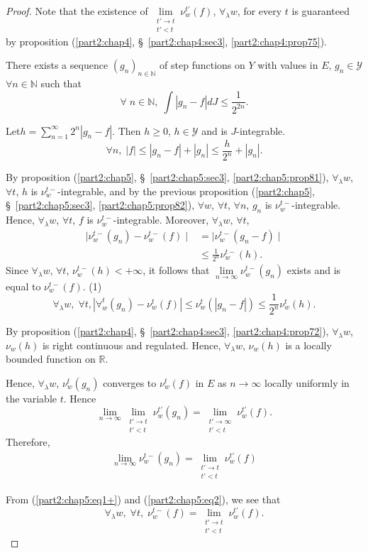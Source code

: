 \begin{proof}
Note that the existence of $\lim\limits_{\substack{t' \to t\\t' <t}}
\nu^{t'}_w(f)$, $\forall_\lambda w$, for every $t$ is guaranteed by
proposition (\ref{part2:chap4}, \S\ \ref{part2:chap4:sec3},
\ref{part2:chap4:prop75}).  

There exists a sequence $(g_n)_{n \in\mathbb{N}}$ of step functions on
$Y$ with values in $E$, $g_n \in \mathscr{Y}$ $\forall n \in
\mathbb{N}$ such that 
$$
\forall \; n \in \mathbb{N}, \; \int |g_n -f| d J \leq
\frac{1}{2^{2n}}. 
$$

Let\pageoriginale $h = \sum\limits^\infty_{n=1} 2^n |g_n -f|$. Then $h
\geq 0$, $h \in \mathscr{Y}$ and is $J$-integrable.
$$
\forall n, \; |f| \leq |g_n -f| + |g_n| \leq \frac{h}{2^n} + |g_n|. 
$$

By proposition (\ref{part2:chap5}, \S\ \ref{part2:chap5:sec3},
\ref{part2:chap5:prop81}), $\forall_\lambda w$, $\forall t$, $h$ 
is $\nu^{t-}_w$-integrable, and by the previous proposition
(\ref{part2:chap5}, \S\ \ref{part2:chap5:sec3},
\ref{part2:chap5:prop82}), $\forall w$, $\forall t$, $\forall n$,
$g_n$ is 
$\nu^{t-}_w$-integrable. Hence, $\forall_\lambda w$, $\forall t$, $f$
is $\nu^{t-}_w$-integrable. Moreover, $\forall_\lambda w$, $\forall
t$, 
\begin{align*}
\mid \nu^{t-}_w(g_n) - \nu^{t-}_w (f)\mid & = \mid \nu^{t-}_w(g_n
-f)\mid\\
& \leq \frac{1}{2^n} \nu^{t-}_w(h).
\end{align*}
Since $\forall_\lambda w$, $\forall t$, $\nu^{t-}_w(h) < + \infty$, it
follows that $\lim\limits_{n \to \infty} \nu^{t-}_w(g_n)$ exists and
is equal to $\nu^{t-}_w(f)$. \hfill{(1)}
$$
\forall_\lambda w, \;\forall t, |\forall^t_w(g_n) - \nu^t_w(f)| \leq
\nu^t_w(|g_n-f|)\leq \frac{1}{2^n}  \nu^t_w(h). 
$$

By proposition (\ref{part2:chap4}, \S\ \ref{part2:chap4:sec3},
\ref{part2:chap4:prop72}), $\forall_\lambda w$, $\nu_w(h)$ is 
right continuous and regulated. Hence, $\forall_\lambda w$, $\nu_w(h)$
is a locally bounded function on $\mathbb{R}$.

Hence, $\forall_\lambda w$, $\nu^t_w(g_n)$ converges to $\nu^t_w(f)$
in $E$ as $n \to \infty$ locally uniformly in the variable $t$. Hence
$$
\lim\limits_{n \to \infty} \lim\limits_{\substack{t'\to t\\t'<t}}
\nu^{t'}_w(g_n) = \lim\limits_{\substack{t'\to \infty\\t'<t}}
\nu^{t'}_w(f). 
$$
Therefore, 
\begin{align*}
\lim\limits_{n \to \infty} \nu^{t-}_w(g_n) =
\lim\limits_{\substack{t'\to t\\ t'<t}} \nu^{t'}_w(f) \tag{2}\label{part2:chap5:eq2} 
\end{align*}

From (\ref{part2:chap5:eq1+}) and (\ref{part2:chap5:eq2}), we see that
$$
\forall_\lambda w, \; \forall t, \; \nu^{t-}_w(f) =
\lim\limits_{\substack{t' \to t\\t'<t}} \nu^{t'}_w(f). 
$$
\end{proof}
